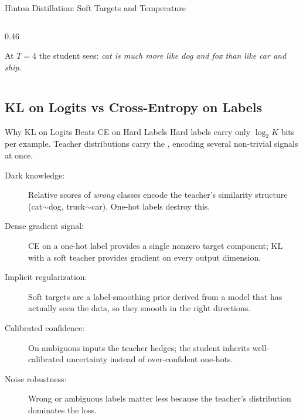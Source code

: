 \begin{frame}{Hinton Distillation: Soft Targets and Temperature}
\begin{columns}[T]
\begin{column}{0.46\textwidth}
      \vspace{0.4em}

      \vspace{0.3em}
      {\scriptsize At $T=4$ the student sees: \emph{cat is much more like dog and fox than like car and ship}.}
    \end{column}
  \end{columns}
\end{frame}

\subsection{KL on Logits vs Cross-Entropy on Labels}

\begin{frame}{Why KL on Logits Beats CE on Hard Labels}
  Hard labels carry only $\log_2 K$ bits per example. Teacher distributions carry the , encoding several non-trivial signals at once.

  \vspace{0.3em}
  \begin{description}
    \item[Dark knowledge:] Relative scores of \emph{wrong} classes encode the teacher's similarity structure (cat$\sim$dog, truck$\sim$car). One-hot labels destroy this.
    \item[Dense gradient signal:] CE on a one-hot label provides a single nonzero target component; KL with a soft teacher provides gradient on every output dimension.
    \item[Implicit regularization:] Soft targets are a label-smoothing prior derived from a model that has actually seen the data, so they smooth in the right directions.
    \item[Calibrated confidence:] On ambiguous inputs the teacher hedges; the student inherits well-calibrated uncertainty instead of over-confident one-hots.
    \item[Noise robustness:] Wrong or ambiguous labels matter less because the teacher's distribution dominates the loss.
  \end{description}
\end{frame}

